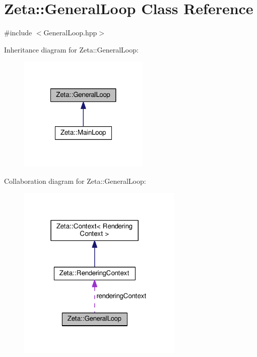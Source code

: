 \hypertarget{classZeta_1_1GeneralLoop}{\section{Zeta\+:\+:General\+Loop Class Reference}
\label{classZeta_1_1GeneralLoop}
}


{\ttfamily \#include $<$General\+Loop.\+hpp$>$}



Inheritance diagram for Zeta\+:\+:General\+Loop\+:\nopagebreak
\begin{figure}[H]
\begin{center}
\leavevmode
\includegraphics[width=176pt]{classZeta_1_1GeneralLoop__inherit__graph}
\end{center}
\end{figure}


Collaboration diagram for Zeta\+:\+:General\+Loop\+:\nopagebreak
\begin{figure}[H]
\begin{center}
\leavevmode
\includegraphics[width=223pt]{classZeta_1_1GeneralLoop__coll__graph}
\end{center}
\end{figure}
